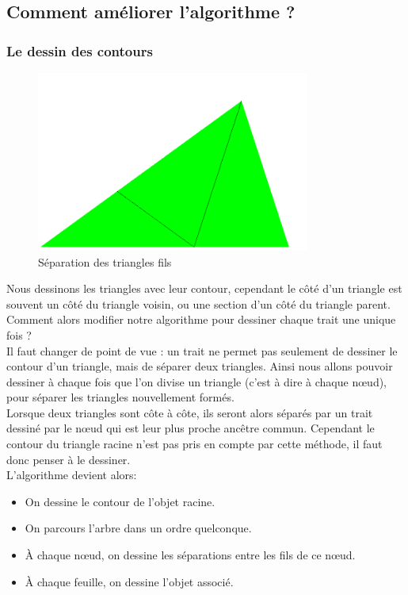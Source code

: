 \documentclass[a4paper,11pt]{article}
\begin{document}
\subsection{Comment améliorer l'algorithme ?}

\subsubsection{Le dessin des contours}
\begin{figure}
  \centering
  \includegraphics[width=0.8\textwidth]{penrose_inline1.png}
  \caption{Séparation des triangles fils}
  \label{fig:penrose_example}
\end{figure}
Nous dessinons les triangles avec leur contour, cependant le côté d'un triangle est souvent
un côté du triangle voisin, ou une section d'un côté du triangle parent.\\

Comment alors modifier notre algorithme pour dessiner chaque trait une unique fois ?\\

Il faut changer de point de vue : un trait ne permet pas seulement de dessiner le contour
d'un triangle, mais de séparer deux triangles. Ainsi nous allons pouvoir dessiner à chaque fois
que l'on divise un triangle (c'est à dire à chaque nœud), pour séparer
les triangles nouvellement formés.\\

Lorsque deux triangles sont côte à côte, ils seront alors séparés par un trait dessiné
par le nœud qui est leur plus proche ancêtre commun. Cependant le contour du triangle racine
n'est pas pris en compte par cette méthode, il faut donc penser à le dessiner.\\

L'algorithme devient alors:
\begin{itemize}
  \item On dessine le contour de l'objet racine.
  \item On parcours l'arbre dans un ordre quelconque.
  \item À chaque nœud, on dessine les séparations entre les fils de ce nœud.
  \item À chaque feuille, on dessine l'objet associé.\\
\end{itemize}
\end{document}
